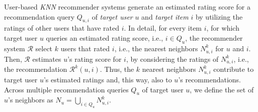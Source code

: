 \documentclass[manuscript,review,anonymous]{acmart}
\begin{document}
User-based \emph{KNN} recommender systems generate an estimated rating score for a recommendation query $Q_{u, i}$ of \emph{target user} $u$ and \emph{target item} $i$ by utilizing the ratings of other users that have rated $i$.
In detail, for every item $i$, for which target user $u$ queries an estimated rating score, i.e., $i \in Q_u$, the recommender system $\mathcal{R}$ select $k$ users that rated $i$, i.e., the nearest neighbors $N^k_{u, i}$ for $u$ and $i$.
Then, $\mathcal{R}$ estimates $u$'s rating score for $i$, by considering the ratings of $N^k_{u, i}$, i.e., the recommendation $\mathcal{R}^k(u, i)$.
Thus, the $k$ nearest neighbors $N^k_{u, i}$ contribute to target user $u$'s estimated ratings and, this way, also to $u$'s recommendations.
Across multiple recommendation queries $Q_u$ of target user $u$, we define the set of $u$'s neighbors as $N_u = \bigcup_{i \in Q_u} N^k_{u, i}$.
\end{document}
